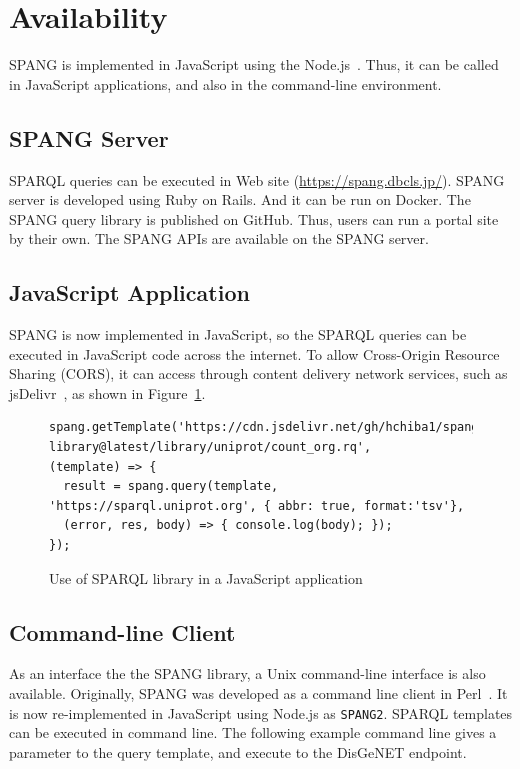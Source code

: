 \documentclass[runningheads]{llncs}
\begin{document}
\section{Availability}


SPANG is implemented in JavaScript using the Node.js~\cite{nodejs}. Thus, it can be called in JavaScript applications, and also in the command-line environment.


\subsection{SPANG Server}
SPARQL queries can be executed in Web site (\url{https://spang.dbcls.jp/}).
SPANG server is developed using Ruby on Rails. And it can be run on Docker. The SPANG query library is published on GitHub. Thus, users can run a portal site by their own. The SPANG APIs are available on the SPANG server.



\subsection{JavaScript Application}
SPANG is now implemented in JavaScript, so the SPARQL queries can be executed in JavaScript code across the internet. To allow Cross-Origin Resource Sharing (CORS), it can access through content delivery network services, such as jsDelivr~\cite{jsdelivr}, as shown in Figure~\ref{fig:jsdelivr}.



\begin{figure}[!t]
\begin{scriptsize}
\begin{verbatim}
spang.getTemplate('https://cdn.jsdelivr.net/gh/hchiba1/spang-library@latest/library/uniprot/count_org.rq', 
(template) => {
  result = spang.query(template, 'https://sparql.uniprot.org', { abbr: true, format:'tsv'}, 
  (error, res, body) => { console.log(body); });
});
\end{verbatim}
\end{scriptsize}
\caption{Use of SPARQL library in a JavaScript application}
\label{fig:jsdelivr}
\end{figure}


\subsection{Command-line Client}
As an interface the the SPANG library, a Unix command-line interface is also available.
Originally, SPANG was developed as a command line client in Perl~\cite{spang}.
It is now re-implemented in JavaScript using Node.js as \texttt{SPANG2}.
SPARQL templates can be executed in command line.
The following example command line gives a parameter to the query template, and execute to the DisGeNET endpoint.
\end{document}
